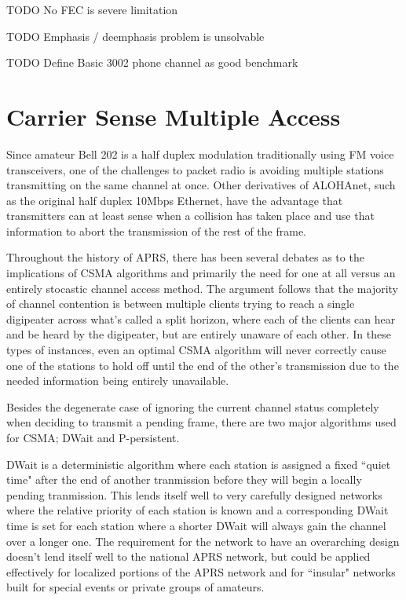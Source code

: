 TODO No FEC is severe limitation

TODO Emphasis / deemphasis problem is unsolvable

TODO Define Basic 3002 phone channel as good benchmark

\section{Carrier Sense Multiple Access}
\label{sec:bell202csma}

Since amateur Bell 202 is a half duplex modulation traditionally using FM voice 
transceivers, one of the challenges to packet radio is avoiding multiple stations
transmitting on the same channel at once. Other derivatives of ALOHAnet, such as 
the original half duplex 10Mbps Ethernet, have the advantage that transmitters can
at least sense when a collision has taken place and use that information to abort
the transmission of the rest of the frame.

Throughout the history of APRS, there has been several debates as to the implications
of CSMA algorithms and primarily the need for one at all versus an entirely 
stocastic channel access method. The argument follows that the majority of 
channel contention is between multiple clients trying to reach a single digipeater
across what's called a split horizon, where each of the clients can hear and be heard
by the digipeater, but are entirely unaware of each other. In these types of instances,
even an optimal CSMA algorithm will never correctly cause one of the stations to hold 
off until the end of the other's transmission due to the needed information being
entirely unavailable.

Besides the degenerate case of ignoring the current channel status completely when 
deciding to transmit a pending frame, there are two major algorithms used for CSMA;
DWait and P-persistent.

DWait is a deterministic algorithm where each station is assigned a fixed
``quiet time" after the end of another tranmission before they will begin a locally
pending tranmission. This lends itself well to very carefully designed networks
where the relative priority of each station is known and a corresponding DWait time
is set for each station where a shorter DWait will always gain the channel over a longer
one. The requirement for the network to have an overarching design doesn't lend itself
well to the national APRS network, but could be applied effectively for localized 
portions of the APRS network and for ``insular" networks built for special events or
private groups of amateurs.

